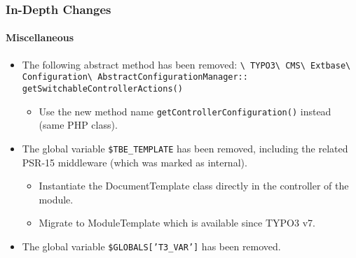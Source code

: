 \begin{frame}[fragile]
	\frametitle{In-Depth Changes}
	\framesubtitle{Miscellaneous}

	\begin{itemize}

		\item The following abstract method has been removed:\newline
			\smaller
				\texttt{\textbackslash
					TYPO3\textbackslash
					CMS\textbackslash
					Extbase\textbackslash
					Configuration\textbackslash
					AbstractConfigurationManager::}\newline
					\texttt{getSwitchableControllerActions()}
			\normalsize

			\begin{itemize}\smaller
				\item[\ding{228}] Use the new method name \texttt{getControllerConfiguration()} instead (same PHP class).
			\end{itemize}\normalsize

		\item The global variable \texttt{\$TBE\_TEMPLATE} has been removed, including
			the related PSR-15 middleware (which was marked as internal).

			\begin{itemize}\smaller
				\item[\ding{228}] Instantiate the DocumentTemplate class directly in the controller of the module.
				\item[\ding{228}] Migrate to ModuleTemplate which is available since TYPO3 v7.
			\end{itemize}\normalsize

		\item The global variable \texttt{\$GLOBALS['T3\_VAR']} has been removed.\newline

	\end{itemize}

\end{frame}


